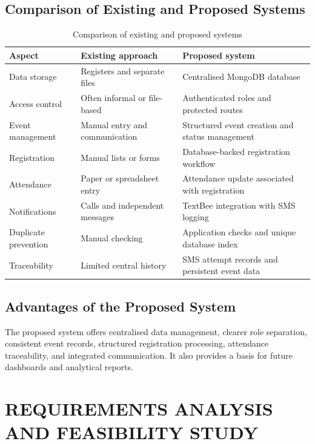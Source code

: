\documentclass[12pt,a4paper,oneside]{report}
\begin{document}
\section{Comparison of Existing and Proposed Systems}
\begin{table}[H]
\centering
\caption{Comparison of existing and proposed systems}
\begin{tabularx}{\textwidth}{|p{3.1cm}|X|X|}
\hline
\textbf{Aspect} & \textbf{Existing approach} & \textbf{Proposed system}\\ \hline
Data storage & Registers and separate files & Centralised MongoDB database\\ \hline
Access control & Often informal or file-based & Authenticated roles and protected routes\\ \hline
Event management & Manual entry and communication & Structured event creation and status management\\ \hline
Registration & Manual lists or forms & Database-backed registration workflow\\ \hline
Attendance & Paper or spreadsheet entry & Attendance update associated with registration\\ \hline
Notifications & Calls and independent messages & TextBee integration with SMS logging\\ \hline
Duplicate prevention & Manual checking & Application checks and unique database index\\ \hline
Traceability & Limited central history & SMS attempt records and persistent event data\\ \hline
\end{tabularx}
\end{table}

\section{Advantages of the Proposed System}
The proposed system offers centralised data management, clearer role separation, consistent event records, structured registration processing, attendance traceability, and integrated communication. It also provides a basis for future dashboards and analytical reports.

\chapter{REQUIREMENTS ANALYSIS AND FEASIBILITY STUDY}
\end{document}
